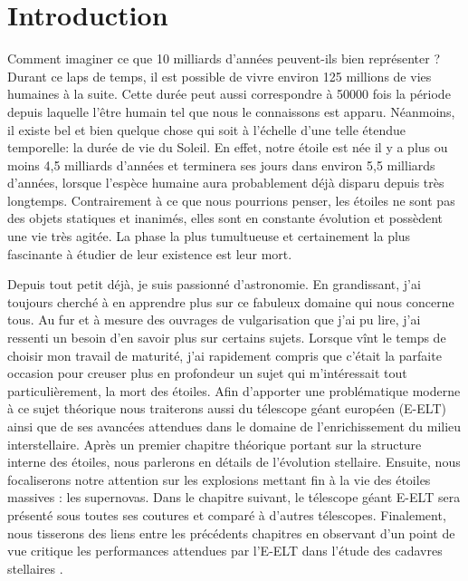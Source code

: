 

\chapter*{Introduction}


\vfill

Comment imaginer ce que 10 milliards d'années peuvent-ils bien représenter ? Durant ce laps de temps, il est possible de vivre environ 125 millions de vies humaines à la suite. Cette durée peut aussi correspondre à 50000 fois la période depuis laquelle l'être humain tel que nous le connaissons est apparu. Néanmoins, il existe bel et bien quelque chose qui soit à l'échelle d'une telle étendue temporelle: la durée de vie du Soleil. En effet, notre étoile est née il y a plus ou moins 4,5 milliards d'années et terminera ses jours dans environ 5,5 milliards d'années, lorsque l'espèce humaine aura probablement déjà disparu depuis très longtemps. Contrairement à ce que nous pourrions penser, les étoiles ne sont pas des objets statiques et inanimés, elles sont en constante évolution et possèdent une vie très agitée. La phase la plus tumultueuse et certainement la plus fascinante à étudier de leur existence est leur mort.\smallskip

 Depuis tout petit déjà, je suis passionné d'astronomie. En grandissant, j'ai toujours cherché à en apprendre plus sur ce fabuleux domaine qui nous concerne tous. Au fur et à mesure des ouvrages de vulgarisation que j'ai pu lire, j'ai ressenti un besoin d'en savoir plus sur certains sujets. Lorsque vînt le temps de choisir mon travail de maturité, j'ai rapidement compris que c'était la parfaite occasion pour creuser plus en profondeur un sujet qui m'intéressait tout particulièrement, la mort des étoiles. Afin d'apporter une problématique moderne à ce sujet théorique nous traiterons aussi du télescope géant européen (E-ELT) ainsi que de ses avancées attendues dans le domaine de l'enrichissement du milieu interstellaire. Après un premier chapitre théorique portant sur la structure interne des étoiles, nous parlerons en détails de l'évolution stellaire. Ensuite, nous focaliserons notre attention sur les explosions mettant fin à la vie des étoiles massives : les supernovas. Dans le chapitre suivant, le télescope géant E-ELT sera présenté sous toutes ses coutures et comparé à d'autres télescopes. Finalement, nous tisserons des liens entre les précédents chapitres en observant d'un point de vue critique les performances attendues par l'E-ELT dans l'étude des cadavres stellaires . 

\vfill

